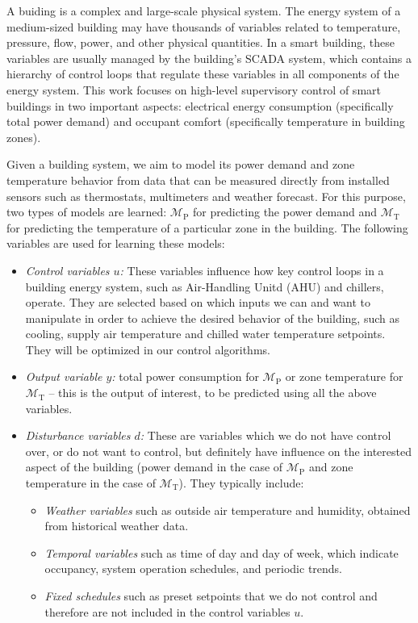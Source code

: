 A buiding is a complex and large-scale physical system.
The energy system of a medium-sized building may have thousands of variables related to temperature, pressure, flow, power, and other physical quantities.
In a smart building, these variables are usually managed by the building's SCADA system, which contains a hierarchy of control loops that regulate these variables in all components of the energy system.
This work focuses on high-level supervisory control of smart buildings in two important aspects: electrical energy consumption (specifically total power demand) and occupant comfort (specifically temperature in building zones).

Given a building system, we aim to model its power demand and zone temperature behavior from data that can be measured directly from installed sensors such as thermostats, multimeters and weather forecast.
For this purpose, two types of models are learned: \(\mathcal{M}_{\mathrm{P}}\) for predicting the power demand and \(\mathcal{M}_{\mathrm{T}}\) for predicting the temperature of a particular zone in the building.
The following variables are used for learning these models:
\begin{itemize}
\item \textit{Control variables \(u\):} These variables influence how key control loops in a building energy system, such as Air-Handling Unitd (AHU) and chillers, operate.  They are selected based on which inputs we can and want to manipulate in order to achieve the desired behavior of the building, such as cooling, supply air temperature and chilled water temperature setpoints.  They will be optimized in our control algorithms.
\item \textit{Output variable \(y\):} total power consumption for \(\mathcal{M}_{\mathrm{P}}\) or zone temperature for \(\mathcal{M}_{\mathrm{T}}\) -- this is the output of interest, to be predicted using all the above variables.
\item \textit{Disturbance variables \(d\):} These are variables which we do not have control over, or do not want to control, but definitely have influence on the interested aspect of the building (power demand in the case of $\mathcal{M}_{\mathrm{P}}$ and zone temperature in the case of $\mathcal{M}_{\mathrm{T}}$).  They typically include:
  \begin{itemize}
  \item \emph{Weather variables} such as outside air temperature and humidity, obtained from historical weather data.
  \item \emph{Temporal variables} such as time of day and day of week, which indicate occupancy, system operation schedules, and periodic trends.
  \item \emph{Fixed schedules} such as preset setpoints that we do not control and therefore are not included in the control variables $u$.
  \end{itemize}
\end{itemize}
